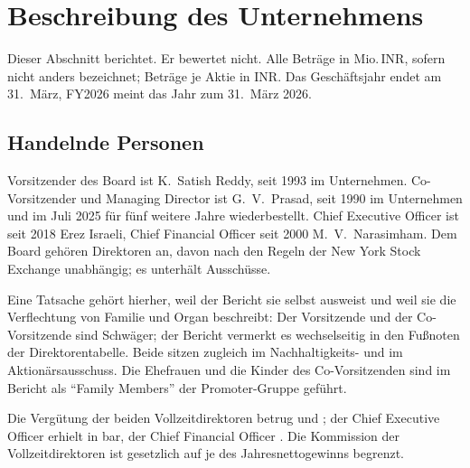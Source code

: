\section{Beschreibung des Unternehmens}
\label{sec:unternehmen-rdy}

Dieser Abschnitt berichtet. Er bewertet nicht. Alle Betr\"age in Mio.\,INR,
sofern nicht anders bezeichnet; Betr\"age je Aktie in INR. Das
Gesch\"aftsjahr endet am 31.~M\"arz, FY2026 meint das Jahr zum 31.~M\"arz 2026.

\subsection{Handelnde Personen}

Vorsitzender des Board ist K.~Satish Reddy, seit 1993 im Unternehmen.
Co-Vorsitzender und Managing Director ist G.~V.~Prasad, seit 1990 im
Unternehmen und im Juli 2025 f\"ur f\"unf weitere Jahre
wiederbestellt.
Chief Executive Officer ist seit 2018 Erez Israeli, Chief Financial Officer
seit 2000 M.~V.~Narasimham.
Dem Board geh\"oren \Stueck{\RdyDirektoren} Direktoren an, davon
\Stueck{\RdyDirektorenUnabh} nach den Regeln der New York Stock Exchange
unabh\"angig; es unterh\"alt \Stueck{\RdyAusschuesse}
Aussch\"usse.

Eine Tatsache geh\"ort hierher, weil der Bericht sie selbst ausweist und weil
sie die Verflechtung von Familie und Organ beschreibt: Der Vorsitzende und der
Co-Vorsitzende sind Schw\"ager; der Bericht vermerkt es wechselseitig in den
Fu{\ss}noten der Direktorentabelle.
Beide sitzen zugleich im Nachhaltigkeits- und im
Aktion\"arsausschuss.
Die Ehefrauen und die Kinder des Co-Vorsitzenden sind im Bericht als
\enquote{Family Members} der Promoter-Gruppe gef\"uhrt.

Die Verg\"utung der beiden Vollzeitdirektoren betrug \MioINR{\RdyVerguetungChairman}
und \MioINR{\RdyVerguetungCoChairman}; der Chief Executive Officer erhielt
\MioINR{\RdyVerguetungCeo} in bar, der Chief Financial Officer
\MioINR{\RdyVerguetungCfo}.
Die Kommission der Vollzeitdirektoren ist gesetzlich auf je
\Pct{\RdyDeckelVollzeit} des Jahresnettogewinns
begrenzt.

